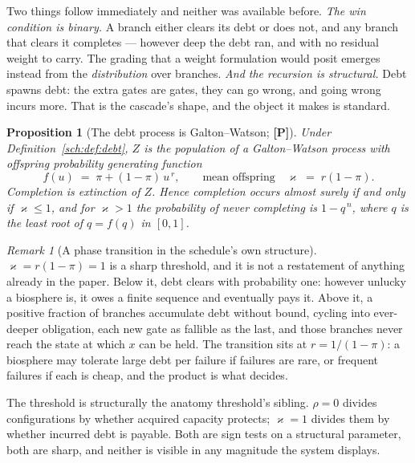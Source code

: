 \documentclass[11pt]{article}
\theoremstyle{plain}
\newtheorem{proposition}[theorem]{Proposition}
\theoremstyle{definition}
\theoremstyle{remark}
\newtheorem{remark}[theorem]{Remark}
\begin{document}
Two things follow immediately and neither was available before. \emph{The win condition is binary.} A branch either clears its debt or
does not, and any branch that clears it completes --- however deep the
debt ran, and with no residual weight to carry. The grading that a
weight formulation would posit emerges instead from the
\emph{distribution} over branches. \emph{And the recursion is structural.} Debt spawns debt: the extra
gates are gates, they can go wrong, and going wrong incurs more. That is
the cascade's shape, and the object it makes is standard.

\begin{proposition}[The debt process is Galton--Watson; \textbf{[P]}]
\label{sch:prop:gw}
Under Definition~\ref{sch:def:debt}, $Z$ is the population of a
Galton--Watson process with offspring probability generating function
\begin{equation}\label{sch:eq:pgf}
f(u)\;=\;\pi+(1-\pi)\,u^{\,r},
\qquad\text{mean offspring}\quad \varkappa\;=\;r(1-\pi).
\end{equation}
Completion is extinction of $Z$. Hence completion occurs almost surely
if and only if $\varkappa\le1$, and for $\varkappa>1$ the probability of never
completing is $1-q^{\,n}$, where $q$ is the least root of $q=f(q)$ in
$[0,1]$.
\end{proposition}

\begin{remark}[A phase transition in the schedule's own structure]
\label{sch:rem:criticality}
$\varkappa=r(1-\pi)=1$ is a sharp threshold, and it is not a restatement of
anything already in the paper. Below it, debt clears with probability one: however unlucky a biosphere
is, it owes a finite sequence and eventually pays it. Above it, a
positive fraction of branches accumulate debt without bound, cycling
into ever-deeper obligation, each new gate as fallible as the last, and those branches never reach the state at which $x$ can be held. The
transition sits at $r=1/(1-\pi)$: a biosphere may tolerate large debt
per failure if failures are rare, or frequent failures if each is cheap,
and the product is what decides.

The threshold is structurally the anatomy threshold's sibling. $\rho=0$
divides configurations by whether acquired capacity protects; $\varkappa=1$
divides them by whether incurred debt is payable. Both are sign tests on
a structural parameter, both are sharp, and neither is visible in any
magnitude the system displays.
\end{remark}
\end{document}
